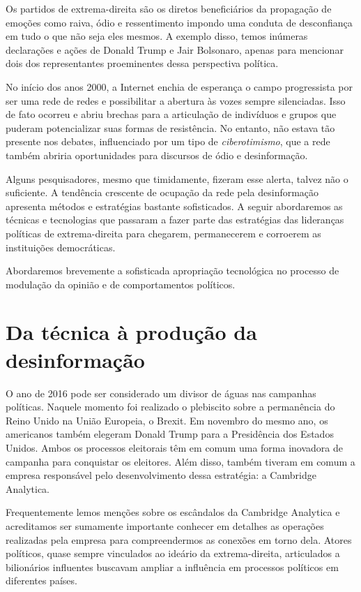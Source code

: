 Os partidos de extrema-direita são os diretos beneficiários da
propagação de emoções como raiva, ódio e ressentimento impondo uma
conduta de desconfiança em tudo o que não seja eles mesmos. A exemplo
disso, temos inúmeras declarações e ações de Donald Trump e Jair
Bolsonaro, apenas para mencionar dois dos representantes proeminentes
dessa perspectiva política.

No início dos anos 2000, a Internet enchia de esperança o campo
progressista por ser uma rede de redes e possibilitar a abertura às
vozes sempre silenciadas. Isso de fato ocorreu e abriu brechas para a
articulação de indivíduos e grupos que puderam potencializar suas formas
de resistência. No entanto, não estava tão presente nos debates,
influenciado por um tipo de \textit{ciberotimismo}, que a rede também abriria
oportunidades para discursos de ódio e desinformação.

Alguns pesquisadores, mesmo que timidamente, fizeram esse alerta, talvez
não o suficiente. A tendência crescente de ocupação da rede pela
desinformação apresenta métodos e estratégias bastante sofisticados. A
seguir abordaremos as técnicas e tecnologias que passaram a fazer parte
das estratégias das lideranças políticas de extrema-direita para
chegarem, permanecerem e corroerem as instituições democráticas.

Abordaremos brevemente a sofisticada apropriação tecnológica no processo
de modulação da opinião e de comportamentos políticos.

\section{Da técnica à produção da desinformação}

O ano de 2016 pode ser considerado um divisor de águas nas campanhas
políticas. Naquele momento foi realizado o plebiscito sobre a
permanência do Reino Unido na União Europeia, o Brexit. Em novembro do
mesmo ano, os americanos também elegeram Donald Trump para a Presidência
dos Estados Unidos. Ambos os processos eleitorais têm em comum uma
forma inovadora de campanha para conquistar os eleitores. Além disso,
também tiveram em comum a empresa responsável pelo desenvolvimento dessa
estratégia: a Cambridge Analytica.

Frequentemente lemos menções sobre os escândalos da Cambridge Analytica
e acreditamos ser sumamente importante conhecer em detalhes as operações
realizadas pela empresa para compreendermos as conexões em torno dela.
Atores políticos, quase sempre vinculados ao ideário da extrema-direita,
articulados a bilionários influentes buscavam ampliar a influência em
processos políticos em diferentes países.

